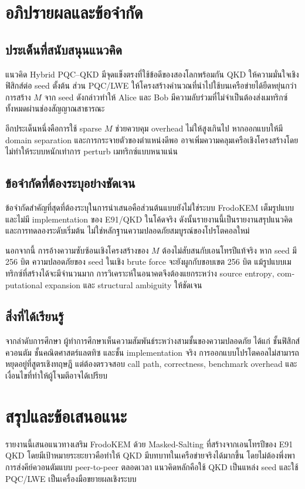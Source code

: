 \documentclass[14pt,a4paper]{extarticle}
\newcommand{\eng}[1]{\textenglish{#1}}
\begin{document}
\section{อภิปรายผลและข้อจำกัด}
\subsection{ประเด็นที่สนับสนุนแนวคิด}
แนวคิด \eng{Hybrid PQC--QKD} มีจุดแข็งตรงที่ใช้ข้อดีของสองโลกพร้อมกัน QKD ให้ความมั่นใจเชิงฟิสิกส์ต่อ seed ตั้งต้น ส่วน PQC/LWE ให้โครงสร้างคำนวณที่นำไปใช้บนเครือข่ายได้ยืดหยุ่นกว่า การสร้าง $M$ จาก seed ดังกล่าวทำให้ Alice และ Bob มีความลับร่วมที่ไม่จำเป็นต้องส่งเมทริกซ์ทั้งหมดผ่านช่องสัญญาณสาธารณะ

อีกประเด็นหนึ่งคือการใช้ sparse $M$ ช่วยควบคุม overhead ไม่ให้สูงเกินไป หากออกแบบให้มี domain separation และการกระจายตัวของตำแหน่งดีพอ อาจเพิ่มความคลุมเครือเชิงโครงสร้างโดยไม่ทำให้ระบบหนักเท่าการ perturb เมทริกซ์แบบหนาแน่น

\subsection{ข้อจำกัดที่ต้องระบุอย่างชัดเจน}
ข้อจำกัดสำคัญที่สุดที่ต้องระบุในการนำเสนอคือส่วนต้นแบบยังไม่ใช่ระบบ FrodoKEM เต็มรูปแบบ และไม่มี implementation ของ E91/QKD ในโค้ดจริง ดังนั้นรายงานนี้เป็นรายงานสรุปแนวคิดและการทดลองระดับเริ่มต้น ไม่ใช่หลักฐานความปลอดภัยสมบูรณ์ของโปรโตคอลใหม่

นอกจากนี้ การอ้างความซับซ้อนเชิงโครงสร้างของ $M$ ต้องไม่สับสนกับเอนโทรปีแท้จริง หาก seed มี 256 บิต ความปลอดภัยของ seed ในเชิง brute force จะยังผูกกับขอบเขต 256 บิต แม้รูปแบบเมทริกซ์ที่สร้างได้จะมีจำนวนมาก การวิเคราะห์ในอนาคตจึงต้องแยกระหว่าง \eng{source entropy}, \eng{computational expansion} และ \eng{structural ambiguity} ให้ชัดเจน

\subsection{สิ่งที่ได้เรียนรู้}
จากลำดับการศึกษา ผู้ทำการศึกษาเห็นความสัมพันธ์ระหว่างสามชั้นของความปลอดภัย ได้แก่ ชั้นฟิสิกส์ควอนตัม ชั้นคณิตศาสตร์แลตทิซ และชั้น implementation จริง การออกแบบโปรโตคอลไม่สามารถหยุดอยู่ที่สูตรเชิงทฤษฎี แต่ต้องตรวจสอบ call path, correctness, benchmark overhead และเงื่อนไขที่ทำให้ผู้โจมตีอาจได้เปรียบ

\section{สรุปและข้อเสนอแนะ}
รายงานนี้เสนอแนวทางเสริม FrodoKEM ด้วย \eng{Masked-Salting} ที่สร้างจากเอนโทรปีของ E91 QKD โดยมีเป้าหมายระยะยาวคือทำให้ QKD มีบทบาทในเครือข่ายจริงได้มากขึ้น โดยไม่ต้องพึ่งพาการส่งคีย์ควอนตัมแบบ \eng{peer-to-peer} ตลอดเวลา แนวคิดหลักคือใช้ QKD เป็นแหล่ง seed และใช้ PQC/LWE เป็นเครื่องมือขยายผลเชิงระบบ
\end{document}

